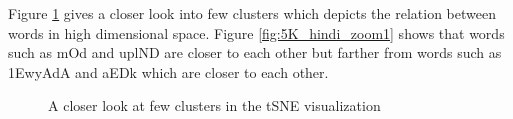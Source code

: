 \def\DevnagVersion{2.15}\documentclass[11pt]{article}
\begin{document}
Figure \ref{fig:5K_hindi_zoom} gives a closer look into few clusters which depicts the relation between words in high dimensional space. Figure \ref{fig:5K_hindi_zoom1} shows that words such as {\dn mOd} and {\dn uplND} are closer to each other but farther from words such as {\dn \31EwyAdA} and {\dn aEDk} which are closer to each other.



\begin{figure}[ht!]
\centering
{}
\caption{A closer look at few clusters in the tSNE visualization\label{fig:5K_hindi_zoom}}
\end{figure}
\end{document}
